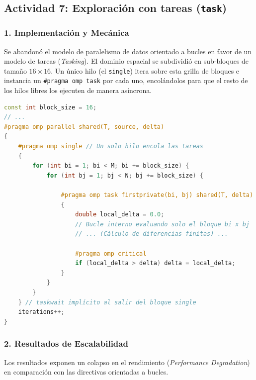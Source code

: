 \documentclass[11pt,a4paper]{article}
\begin{document}
\subsection*{Actividad 7: Exploración con tareas (\texttt{task})}

\subsubsection*{1. Implementación y Mecánica}
Se abandonó el modelo de paralelismo de datos orientado a bucles en favor de un modelo de tareas (\textit{Tasking}). El dominio espacial se subdividió en sub-bloques de tamaño $16 \times 16$. Un único hilo (el \texttt{single}) itera sobre esta grilla de bloques e instancia un \texttt{\#pragma omp task} por cada uno, encolándolos para que el resto de los hilos libres los ejecuten de manera asíncrona.

\begin{lstlisting}[language=C++, caption={Implementación de tareas asíncronas por bloques de memoria.}, label={lst:act7}]
const int block_size = 16; 
// ...
#pragma omp parallel shared(T, source, delta)
{
    #pragma omp single // Un solo hilo encola las tareas
    {
        for (int bi = 1; bi < M; bi += block_size) {
            for (int bj = 1; bj < N; bj += block_size) {
                
                #pragma omp task firstprivate(bi, bj) shared(T, delta)
                {
                    double local_delta = 0.0;
                    // Bucle interno evaluando solo el bloque bi x bj
                    // ... (Cálculo de diferencias finitas) ...
                    
                    #pragma omp critical
                    if (local_delta > delta) delta = local_delta;
                }
            }
        }
    } // taskwait implícito al salir del bloque single
    iterations++; 
}
\end{lstlisting}

\subsubsection*{2. Resultados de Escalabilidad}
Los resultados exponen un colapso en el rendimiento (\textit{Performance Degradation}) en comparación con las directivas orientadas a bucles.
\end{document}
